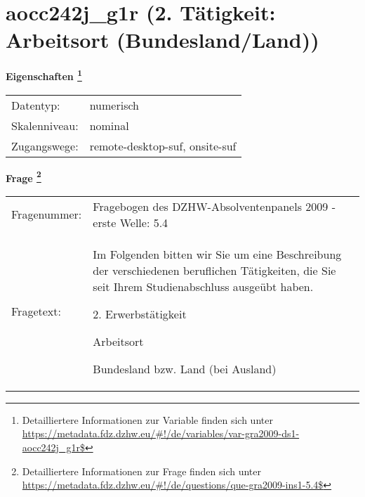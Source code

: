 
    \setcounter{footnote}{0}

    \vspace*{-1.8cm}
	\section{aocc242j\_g1r (2. Tätigkeit: Arbeitsort (Bundesland/Land))}
	\label{section:aocc242j_g1r}



    \vspace*{0.5cm}
    \noindent\textbf{Eigenschaften
	\footnote{Detailliertere Informationen zur Variable finden sich unter
		\url{https://metadata.fdz.dzhw.eu/\#!/de/variables/var-gra2009-ds1-aocc242j_g1r$}}}\\
	\begin{tabularx}{\hsize}{@{}lX}
	Datentyp: & numerisch \\
	Skalenniveau: & nominal \\
	Zugangswege: &
	  remote-desktop-suf, 
	  onsite-suf
 \\
    \end{tabularx}



				\vspace*{0.5cm}
                \noindent\textbf{Frage
	                \footnote{Detailliertere Informationen zur Frage finden sich unter
		              \url{https://metadata.fdz.dzhw.eu/\#!/de/questions/que-gra2009-ins1-5.4$}}}\\
				\begin{tabularx}{\hsize}{@{}lX}
					Fragenummer: &
					  Fragebogen des DZHW-Absolventenpanels 2009 - erste Welle:
					  5.4
 \\
					Fragetext: & Im Folgenden bitten wir Sie um eine Beschreibung der verschiedenen beruflichen Tätigkeiten, die Sie seit Ihrem Studienabschluss ausgeübt haben.\par  2. Erwerbstätigkeit\par  Arbeitsort\par  Bundesland bzw. Land (bei Ausland) \\
				\end{tabularx}





